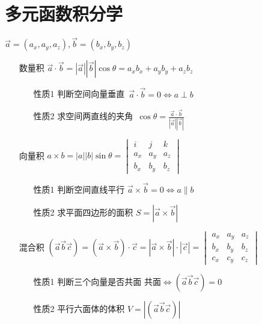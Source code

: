 \documentclass[12pt, a4paper, oneside, UTF8]{ctexbook}
\begin{document}

\else
\fi

\chapter{多元函数积分学}

\begin{tcolorbox}[title=三维向量]
$\vec{a}=(a_x,a_y,a_z), \vec{b}=(b_x,b_y,b_z)$ 
\begin{enumerate}
    \item [数量积] $\vec{a}\cdot\vec{b} = \left|\vec{a}\right|\left|\vec{b}\right|\cos{\theta}=
    a_xb_x+a_yb_y+a_zb_z$ 
    \begin{enumerate}
        \item [性质1] 判断空间向量垂直\ $\vec{a}\cdot\vec{b}=0\iff a\perp b$ 
        \item [性质2] 求空间两直线的夹角\ $\displaystyle \cos\theta = \frac{\vec{a}\cdot\vec{b}}{\left|\vec{a}\right|\left|\vec{b}\right|}$
    \end{enumerate}
    \item [向量积] $a\times b = |a||b|\sin\theta = \begin{vmatrix}
        i & j & k\\
        a_x & a_y & a_z \\
        b_x & b_y & b_z
    \end{vmatrix}$
    \begin{enumerate}
        \item [性质1] 判断空间直线平行 $\vec{a}\times\vec{b}=0\iff a\parallel b$
        \item [性质2] 求平面四边形的面积 $S=\left|\vec{a}\times\vec{b}\right|$ 
    \end{enumerate}
    \item [混合积] $(\vec{a}\vec{b}\vec{c})=(\vec{a}\times\vec{b})\cdot\vec{c} = \left|\vec{a}\times\vec{b}\right|\cdot\left|\vec{c}\right|
    =\begin{vmatrix}
        a_x & a_y & a_z \\
        b_x & b_y & b_z \\
        c_x & c_y & c_z
    \end{vmatrix}$ 
    \begin{enumerate}
        \item [性质1] 判断三个向量是否共面 $\text{共面}\iff (\vec{a}\vec{b}\vec{c})=0$
        \item [性质2] 平行六面体的体积 $V=\left|(\vec{a}\vec{b}\vec{c})\right|$
    \end{enumerate}
\end{enumerate}

\end{tcolorbox}
\end{document}
